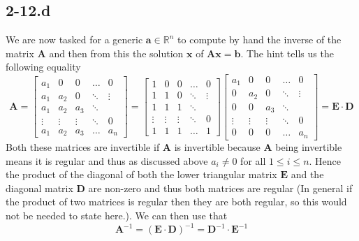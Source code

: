\documentclass{article}
\begin{document}
\subsection*{2-12.d}
We are now tasked for a generic $\mathbf{a} \in \mathbb{R}^{n}$ to compute by hand the inverse of the matrix $\mathbf{A}$ and then from this the solution $\mathbf{x}$ of $\mathbf{A}\mathbf{x} = \mathbf{b}$. The hint tells us the following equality
\begin{equation*}
\mathbf{A} =
    \begin{bmatrix}
        a_{1}& 0 & 0 & \dots & 0 \\
    a_{1} & a_{2}& 0 & \ddots & \vdots \\
    a_{1} & a_{2} & a_{3} & \ddots & \\
    \vdots & \vdots & \vdots& \ddots & 0 \\
    a_{1} & a_{2} & a_{3} & \dots & a_{n}
    \end{bmatrix} =  \begin{bmatrix}
        1& 0 & 0 & \dots & 0 \\
    1 & 1& 0 & \ddots & \vdots \\
    1 & 1 & 1 & \ddots & \\
    \vdots & \vdots & \vdots& \ddots & 0 \\
    1 & 1& 1 & \dots & 1
    \end{bmatrix} \begin{bmatrix}
        a_{1}& 0 & 0 & \dots & 0 \\
    0 & a_{2}& 0 & \ddots & \vdots \\
    0& 0 & a_{3} & \ddots & \\
    \vdots & \vdots & \vdots& \ddots & 0 \\
    0 & 0 & 0 & \dots & a_{n}
    \end{bmatrix} = \mathbf{E} \cdot \mathbf{D}
\end{equation*}
Both these matrices are invertible if $\mathbf{A}$ is invertible because $\mathbf{A}$ being invertible means it is regular and thus as discussed above $a_{i} \neq 0$ for all $1\leq i \leq n$. Hence the product of the diagonal of both the lower triangular matrix $\mathbf{E}$ and the diagonal matrix $\mathbf{D}$ are non-zero and thus both matrices are regular (In general if the product of two matrices is regular then they are both regular, so this would not be needed to state here.). We can then use that
\begin{equation*}
    \mathbf{A}^{-1} = \left(\mathbf{E}\cdot \mathbf{D}\right)^{-1} = \mathbf{D}^{-1}\cdot \mathbf{E}^{-1}
\end{equation*}
\end{document}
